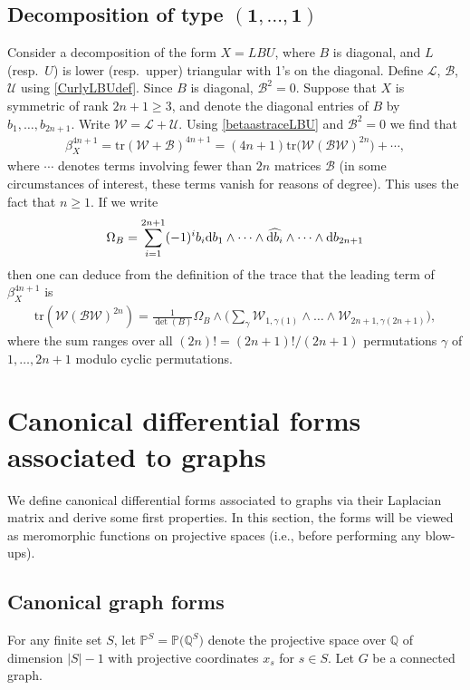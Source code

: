\documentclass[pdftex]{sigma}%
\numberwithin{equation}{section}
\newcommand{\Q}{\mathbb Q}
\newcommand{\Pro}{\mathbb P}
\newcommand{\tr}{\mathrm{tr}}
\newcommand{\0}{\color{blue}{\mathsf{0}}}
\begin{document}
\subsection[Decomposition of type (1,...,1)]
{Decomposition of type $\boldsymbol{(1,\dots,1)}$}

Consider a decomposition of the form $X=LBU$, where $B$ is diagonal, and $L$ (resp.~$U$) is lower (resp.~upper) triangular with 1's on the diagonal. Define $\mathcal{L}$, $\mathcal{B}$, $\mathcal{U}$ using \eqref{CurlyLBUdef}. Since $B$ is diagonal, $\mathcal{B}^2=0$. Suppose that $X$ is symmetric of rank $2n+1\geq 3$, and denote the diagonal entries of $B$ by $b_1,\dots, b_{2n+1}$.
Write $\mathcal{W} = \mathcal{L} + \mathcal{U}$. Using \eqref{betaastraceLBU} and $\mathcal{B}^2=0$ we find that
\begin{gather*}
\beta_X^{4n+1} = \tr (\mathcal{W} + \mathcal{B})^{4n+1} = (4n+1) \tr \big(\mathcal{W} (\mathcal{B} \mathcal{W})^{2n}\big) + \cdots,
\end{gather*}
where $\cdots$ denotes terms involving fewer than $2n$ matrices $\mathcal{B}$ (in some circumstances of interest, these terms vanish for reasons of degree). This uses the fact that $n\geq 1$.
If we write
\begin{gather*}
\Omega_B = \sum_{i=1}^{2n+1} (-1)^i b_i {\rm d}b_1 \wedge \dots \wedge \widehat{{\rm d}b_i} \wedge \dots \wedge {\rm d}b_{2n+1}
\end{gather*}
then one can deduce from the definition of the trace that the leading term of $\beta_X^{4n+1}$ is
\begin{gather} \label{PulloutEigenvalues} \tr \left( \mathcal{W} (\mathcal{B} \mathcal{W})^{2n}\right) = \frac{ 1}{\det(B)} \Omega_B \wedge \bigg( \sum_{\gamma} \mathcal{W}_{1, \gamma(1)} \wedge \dots \wedge \mathcal{W}_{2n+1, \gamma(2n+1)} \bigg),
\end{gather}
where the sum ranges over all $(2n)! = (2n+1)!/(2n+1)$ permutations $\gamma$ of $1,\dots, 2n+1$ modulo cyclic permutations.

\section{Canonical differential forms associated to graphs}
We define canonical differential forms associated to graphs via their Laplacian matrix
 and derive some first properties. In this section, the forms will be viewed as meromorphic functions on projective spaces (i.e., before performing any blow-ups).

\subsection{Canonical graph forms}
 For any finite set $S$, let $\Pro^S= \Pro\big(\Q^S\big)$ denote the projective space over $\Q$ of dimension $|S|-1$ with projective coordinates $x_s$ for $s\in S$.
 Let $G$ be a connected graph.
\end{document}
